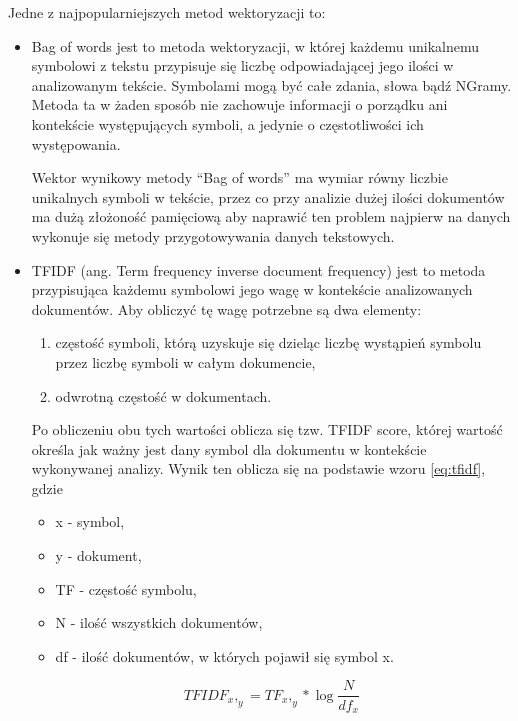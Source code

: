 Jedne z najpopularniejszych metod wektoryzacji to: ~\cite{ML}
\begin{itemize}
    \item Bag of words jest to metoda wektoryzacji, w której każdemu unikalnemu symbolowi z tekstu przypisuje się liczbę 
    odpowiadającej jego ilości w analizowanym tekście. Symbolami mogą być całe zdania, słowa bądź NGramy. 
    Metoda ta w żaden sposób nie zachowuje informacji o porządku ani kontekście występujących symboli, a jedynie o 
    częstotliwości ich występowania. 
    
    Wektor wynikowy metody ``Bag of words'' ma wymiar równy liczbie unikalnych symboli w tekście, przez co przy analizie dużej ilości 
    dokumentów ma dużą złożoność pamięciową aby naprawić ten problem najpierw na danych wykonuje się metody przygotowywania danych tekstowych.

    \item TFIDF (ang. Term frequency inverse document frequency) jest to metoda przypisująca każdemu symbolowi 
    jego wagę w kontekście analizowanych dokumentów. Aby obliczyć tę wagę potrzebne są dwa elementy:
    \begin{enumerate}
        \item częstość symboli, którą uzyskuje się dzieląc liczbę wystąpień symbolu przez liczbę symboli w całym dokumencie,
        \item odwrotną częstość w dokumentach.
    \end{enumerate}
    Po obliczeniu obu tych wartości oblicza się tzw. TFIDF score, której wartość określa jak ważny jest dany symbol 
    dla dokumentu w kontekście wykonywanej analizy. Wynik ten oblicza się na podstawie wzoru \ref{eq:tfidf}, gdzie
    \begin{itemize}
        \item x - symbol,
        \item y - dokument,
        \item TF - częstość symbolu,
        \item N - ilość wszystkich dokumentów,
        \item df - ilość dokumentów, w których pojawił się symbol x.
    \end{itemize}

    \begin{equation}
        \label{eq:tfidf}
        TFIDF_x,_y = TF_x,_y* \log{\frac{N}{df_x}}
    \end{equation}
\end{itemize}